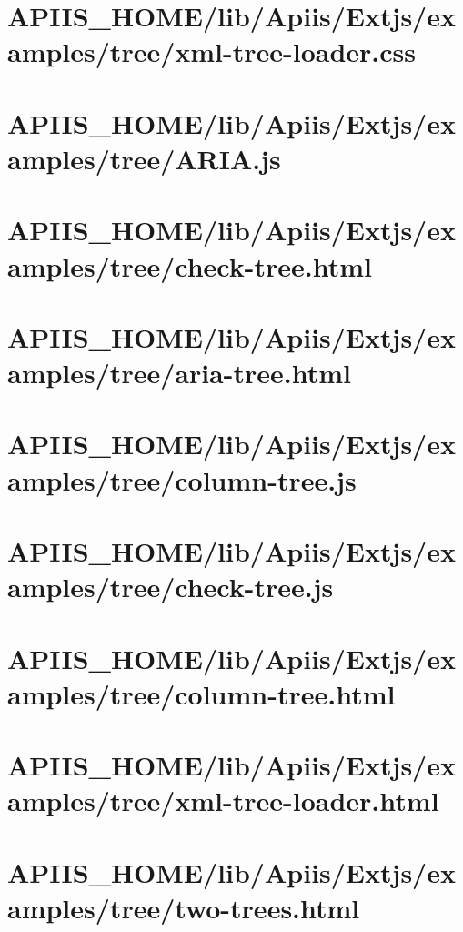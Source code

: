\section{APIIS\_HOME/lib/Apiis/Extjs/examples/tree/xml-tree-loader.css} 
\section{APIIS\_HOME/lib/Apiis/Extjs/examples/tree/ARIA.js} 
\section{APIIS\_HOME/lib/Apiis/Extjs/examples/tree/check-tree.html} 
\section{APIIS\_HOME/lib/Apiis/Extjs/examples/tree/aria-tree.html} 
\section{APIIS\_HOME/lib/Apiis/Extjs/examples/tree/column-tree.js} 
\section{APIIS\_HOME/lib/Apiis/Extjs/examples/tree/check-tree.js} 
\section{APIIS\_HOME/lib/Apiis/Extjs/examples/tree/column-tree.html} 
\section{APIIS\_HOME/lib/Apiis/Extjs/examples/tree/xml-tree-loader.html} 
\section{APIIS\_HOME/lib/Apiis/Extjs/examples/tree/two-trees.html} 
